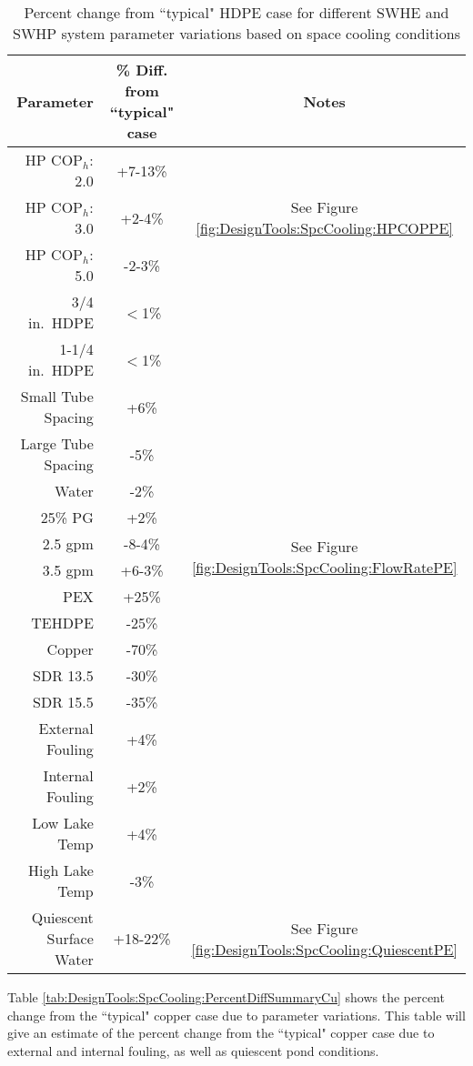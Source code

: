 	\begin{table}[h]
		\centering
		\caption[Percent change summary across all HDPE space cooling design diagrams]{Percent change from ``typical" HDPE case for different SWHE and SWHP system parameter variations based on space cooling conditions}
		\label{tab:DesignTools:SpcCooling:PercentDiffSummaryHDPE}
		\begin{tabular}{r c c}
		\hline
		Parameter & \% Diff. from ``typical" case & Notes\\
		\hline\hline
		HP $\mbox{COP}_h$: 2.0 & +7-13\% & \multirow{3}{*}{See Figure \ref{fig:DesignTools:SpcCooling:HPCOPPE}} \\
		HP $\mbox{COP}_h$: 3.0 & +2-4\% & \\
		HP $\mbox{COP}_h$: 5.0 & -2-3\% & \\
		\hline
		3/4 in.\ HDPE & $<$1\% & \\
		1-1/4 in.\ HDPE & $<$1\% & \\
		\hline
		Small Tube Spacing & +6\% & \\
		Large Tube Spacing & -5\% & \\
		\hline
		Water & -2\% & \\
		25\% PG & +2\% & \\
		\hline
		2.5 gpm & -8-4\% & \multirow{2}{*}{See Figure \ref{fig:DesignTools:SpcCooling:FlowRatePE}} \\
		3.5 gpm & +6-3\% & \\
		\hline
		PEX & +25\% & \\
		TEHDPE & -25\% & \\
		Copper & -70\% & \\
		\hline
		SDR 13.5 & -30\% & \\
		SDR 15.5 & -35\% & \\
		\hline
		External Fouling & +4\% & \\
		Internal Fouling & +2\% & \\
		\hline
		Low Lake Temp & +4\% & \\
		High Lake Temp & -3\% & \\
		\hline
		Quiescent Surface Water & +18-22\% & See Figure \ref{fig:DesignTools:SpcCooling:QuiescentPE}\\
		\hline		
		\end{tabular}
	\end{table}
	
Table \ref{tab:DesignTools:SpcCooling:PercentDiffSummaryCu} shows the percent change from the ``typical" copper case due to parameter variations. This table will give an estimate of the percent change from the ``typical" copper case due to external and internal fouling, as well as quiescent pond conditions.
	
